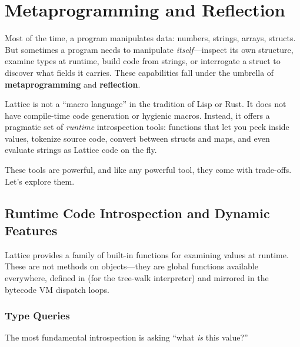 \chapter{Metaprogramming and Reflection}\label{ch:metaprogramming}


Most of the time, a program manipulates data: numbers, strings, arrays, structs.
But sometimes a program needs to manipulate \emph{itself}---inspect its own structure, examine types at runtime, build code from strings, or interrogate a struct to discover what fields it carries.
These capabilities fall under the umbrella of \textbf{metaprogramming} and \textbf{reflection}.

Lattice is not a ``macro language'' in the tradition of Lisp or Rust.
It does not have compile-time code generation or hygienic macros.
Instead, it offers a pragmatic set of \emph{runtime} introspection tools: functions that let you peek inside values, tokenize source code, convert between structs and maps, and even evaluate strings as Lattice code on the fly.

These tools are powerful, and like any powerful tool, they come with trade-offs.
Let's explore them.

\section{Runtime Code Introspection and Dynamic Features}\label{sec:introspection}


Lattice provides a family of built-in functions for examining values at runtime.
These are not methods on objects---they are global functions available everywhere, defined in  (for the tree-walk interpreter) and mirrored in the bytecode VM dispatch loops.

\subsection{Type Queries}

The most fundamental introspection is asking ``what \emph{is} this value?''


